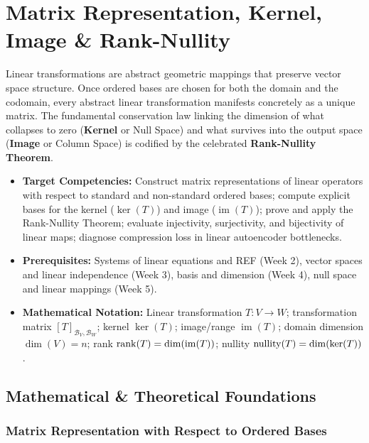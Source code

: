 \chapter{Matrix Representation, Kernel, Image \& Rank-Nullity}

Linear transformations are abstract geometric mappings that preserve vector space structure. Once ordered bases are chosen for both the domain and the codomain, every abstract linear transformation manifests concretely as a unique matrix. The fundamental conservation law linking the dimension of what collapses to zero (\textbf{Kernel} or Null Space) and what survives into the output space (\textbf{Image} or Column Space) is codified by the celebrated \textbf{Rank-Nullity Theorem}.

\vspace{0.5cm}
\begin{tcolorbox}[colback=primarylight, colframe=primarydark, title={\textbf{Executive Roadmap \& Learning Objectives}}]
\begin{itemize}
    \item \textbf{Target Competencies:} Construct matrix representations of linear operators with respect to standard and non-standard ordered bases; compute explicit bases for the kernel ($\ker(T)$) and image ($\operatorname{im}(T)$); prove and apply the Rank-Nullity Theorem; evaluate injectivity, surjectivity, and bijectivity of linear maps; diagnose compression loss in linear autoencoder bottlenecks.
    \item \textbf{Prerequisites:} Systems of linear equations and REF (Week 2), vector spaces and linear independence (Week 3), basis and dimension (Week 4), null space and linear mappings (Week 5).
    \item \textbf{Mathematical Notation:} Linear transformation $T: V \to W$; transformation matrix $[T]_{\mathcal{B}_V, \mathcal{B}_W}$; kernel $\ker(T)$; image/range $\operatorname{im}(T)$; domain dimension $\dim(V) = n$; rank $\operatorname{rank}(T) = \dim(\operatorname{im}(T))$; nullity $\operatorname{nullity}(T) = \dim(\ker(T))$.
\end{itemize}
\end{tcolorbox}

\section{Mathematical \& Theoretical Foundations}

\subsection{Matrix Representation with Respect to Ordered Bases}

